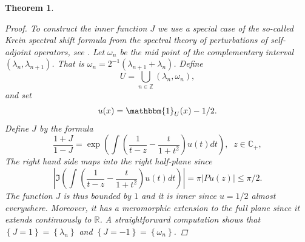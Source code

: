 \documentclass{article}[12pt]
\newtheorem{theorem}{Theorem}
\theoremstyle{remark}
\begin{document}
\begin{theorem}
\begin{proof}
            To construct the inner function $J$ we use a special case of the so-called Krein spectral shift formula from the spectral theory of perturbations of self-adjoint operators, see \cite{MR139006}. Let $\omega_{n}$ be the mid point of the complementary interval $(\lambda_{n},\lambda_{n+1})$. That is $\omega_{n} = 2^{-1}(\lambda_{n+1}+\lambda_{n})$. Define 
            \begin{equation*}
                U = \bigcup_{n \in \mathbb{Z}} (\lambda_{n},\omega_{n}),    
            \end{equation*}
            and set
            \begin{equation*}
                u(x) = \mathbbm{1}_{U}(x) - 1/2.
            \end{equation*}
            Define $J$ by the formula
            \begin{equation}\label{eq:def_J}
                \frac{1+J}{1-J} = \exp \left(\int \left(\frac{1}{t-z}-\frac{t}{1+t^{2}}\right)u(t)dt\right), \; \; z\in \mathbb{C}_{+},
            \end{equation}
            The right hand side maps into the right half-plane since
            \begin{equation*}
                \left\lvert \Im\left( \int \left(\frac{1}{t-z}-\frac{t}{1+t^{2}}\right)u(t)dt\right) \right\rvert = \pi \lvert Pu(z)\rvert \leq \pi/2.
            \end{equation*}
            The function $J$ is thus bounded by $1$ and it is inner since $u = 1/2$ almost everywhere. Moreover, it has a meromorphic extension to the full plane since it extends continuously to $\mathbb{R}$. A straightforward computation shows that $\left\{ J = 1 \right\} = \left\{\lambda_{n}\right\}$ and $\left\{ J = -1 \right\} = \left\{ \omega_{n} \right\}$.
            

\end{proof}
\end{theorem}
\end{document}
